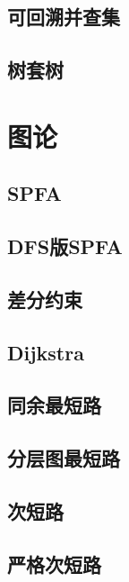 \documentclass{article}
\begin{document}
\subsection{可回溯并查集} 


\subsection{树套树} 



\newpage %
\section{图论} %
\subsection{SPFA} 

\subsection{DFS版SPFA} 

\subsection{差分约束} 

\subsection{Dijkstra} 

\subsection{同余最短路} 

\subsection{分层图最短路} 

\subsection{次短路} 

\subsection{严格次短路} 

\end{document}
